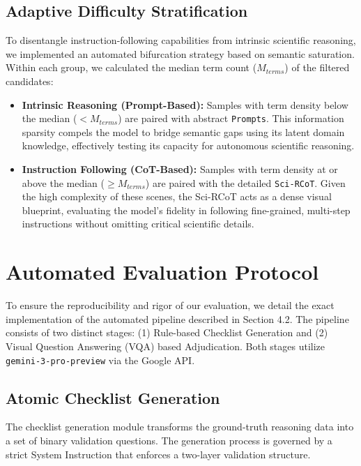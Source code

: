 \documentclass[runningheads]{llncs}
\begin{document}
\subsection{Adaptive Difficulty Stratification}
To disentangle instruction-following capabilities from intrinsic scientific reasoning, we implemented an automated bifurcation strategy based on semantic saturation. Within each group, we calculated the median term count ($M_{terms}$) of the filtered candidates:

\begin{itemize}
    \item \textbf{Intrinsic Reasoning (Prompt-Based):} Samples with term density below the median ($< M_{terms}$) are paired with abstract \texttt{Prompts}. This information sparsity compels the model to bridge semantic gaps using its latent domain knowledge, effectively testing its capacity for autonomous scientific reasoning.
    \item \textbf{Instruction Following (CoT-Based):} Samples with term density at or above the median ($\geq M_{terms}$) are paired with the detailed \texttt{Sci-RCoT}. Given the high complexity of these scenes, the Sci-RCoT acts as a dense visual blueprint, evaluating the model's fidelity in following fine-grained, multi-step instructions without omitting critical scientific details.
\end{itemize}

\section{Automated Evaluation Protocol}
\label{app:evaluation_protocol}

To ensure the reproducibility and rigor of our evaluation, we detail the exact implementation of the automated pipeline described in Section 4.2. The pipeline consists of two distinct stages: (1) Rule-based Checklist Generation and (2) Visual Question Answering (VQA) based Adjudication. Both stages utilize \texttt{gemini-3-pro-preview} via the Google API.

\subsection{Atomic Checklist Generation}
The checklist generation module transforms the ground-truth reasoning data into a set of binary validation questions. The generation process is governed by a strict System Instruction that enforces a two-layer validation structure.
\end{document}
